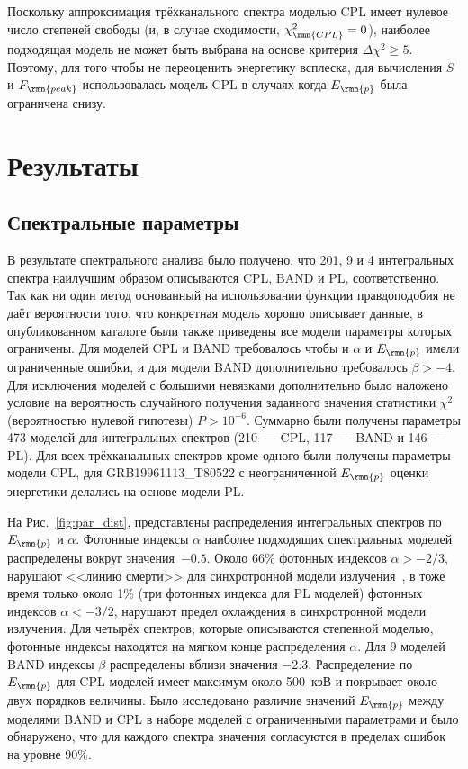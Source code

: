 Поскольку аппроксимация трёхканального спектра моделью CPL имеет нулевое число степеней свободы
(и, в случае сходимости, $\chi_\rmn{CPL}^2=0$), наиболее подходящая модель 
не может быть выбрана на основе критерия $\Delta \chi^2 \geq 5$.
Поэтому, для того чтобы не переоценить энергетику всплеска, для вычисления $S$ и $F_\rmn{peak}$
использовалась модель CPL в случаях когда $E_\rmn{p}$ была ограничена снизу.

\section{Результаты}\label{sec:RESULTS}
\subsection{Спектральные параметры}
В результате спектрального анализа было получено, что 201, 9 и 4 интегральных 
спектра наилучшим образом описываются CPL, BAND и PL, соответственно. 
Так как ни один метод основанный на использовании функции правдоподобия не даёт 
вероятности того, что конкретная модель хорошо описывает данные, в опубликованном 
каталоге были также приведены все модели параметры которых ограничены.
Для моделей CPL и BAND требовалось чтобы и $\alpha$ и $E_\rmn{p}$ имели ограниченные ошибки,
и для модели BAND дополнительно требовалось $\beta > -4$. Для исключения моделей
с большими невязками дополнительно было наложено условие на вероятность 
случайного получения заданного значения статистики $\chi^2$ 
(вероятностью нулевой гипотезы) $P> 10^{-6}$. 
Суммарно были получены параметры 473 моделей
для интегральных спектров (210~--- CPL, 117~--- BAND и 146~--- PL).
Для всех трёхканальных спектров кроме одного были получены параметры модели CPL, для GRB19961113\_T80522 с 
неограниченной $E_\rmn{p}$ оценки энергетики делались на основе модели PL\footnotemark. 


На Рис.~\ref{fig:par_dist}, представлены распределения интегральных спектров по $E_\rmn{p}$ и $\alpha$.
Фотонные индексы $\alpha$ наиболее подходящих спектральных моделей распределены 
вокруг значения~$-0.5$. 
Около 66\% фотонных индексов $\alpha > -2/3$, нарушают <<линию смерти>> для 
синхротронной модели излучения~\citep{Preece_1998ApJL}, в тоже время только около 
1\% (три фотонных индекса для PL моделей) фотонных индексов $\alpha< -3/2$, 
нарушают предел охлаждения в синхротронной модели излучения. 
Для четырёх спектров, которые описываются степенной моделью, фотонные индексы 
находятся на мягком конце распределения $\alpha$. Для 9 моделей BAND индексы $\beta$
распределены вблизи значения $-2.3$.
Распределение по $E_\rmn{p}$ для CPL моделей имеет максимум около 500~кэВ 
и покрывает около двух порядков величины. 
Было исследовано различие значений $E_\rmn{p}$ между моделями BAND и CPL в наборе 
моделей с ограниченными параметрами и было обнаружено, что для каждого спектра значения согласуются
в пределах ошибок на уровне 90\%.

